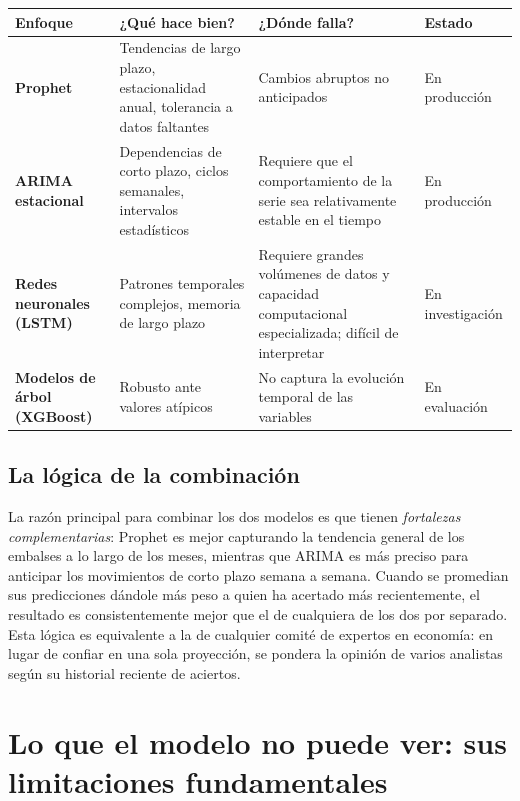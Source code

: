 \documentclass[11pt,a4paper]{article}
\begin{document}
\begin{center}
\small
\begin{tabular}{@{}p{2.8cm}p{4.5cm}p{3.5cm}p{3.5cm}@{}}
\toprule
\textbf{Enfoque} & \textbf{¿Qué hace bien?} & \textbf{¿Dónde falla?} & \textbf{Estado} \\
\midrule
\textbf{Prophet} &
Tendencias de largo plazo, estacionalidad anual, tolerancia a datos faltantes &
Cambios abruptos no anticipados &
\textcolor{okgreen}{En producción} \\
\addlinespace
\textbf{ARIMA estacional} &
Dependencias de corto plazo, ciclos semanales, intervalos estadísticos &
Requiere que el comportamiento de la serie sea relativamente estable en el tiempo &
\textcolor{okgreen}{En producción} \\
\addlinespace
\textbf{Redes neuronales (LSTM)} &
Patrones temporales complejos, memoria de largo plazo &
Requiere grandes volúmenes de datos y capacidad computacional especializada; difícil de interpretar &
\textcolor{warnorange}{En investigación} \\
\addlinespace
\textbf{Modelos de árbol (XGBoost)} &
Robusto ante valores atípicos &
No captura la evolución temporal de las variables &
\textcolor{warnorange}{En evaluación} \\
\bottomrule
\end{tabular}
\end{center}

\subsection{La lógica de la combinación}

La razón principal para combinar los dos modelos es que tienen \textit{fortalezas complementarias}: Prophet es mejor capturando la tendencia general de los embalses a lo largo de los meses, mientras que ARIMA es más preciso para anticipar los movimientos de corto plazo semana a semana. Cuando se promedian sus predicciones dándole más peso a quien ha acertado más recientemente, el resultado es consistentemente mejor que el de cualquiera de los dos por separado. Esta lógica es equivalente a la de cualquier comité de expertos en economía: en lugar de confiar en una sola proyección, se pondera la opinión de varios analistas según su historial reciente de aciertos.

\section{Lo que el modelo no puede ver: sus limitaciones fundamentales}
\end{document}
